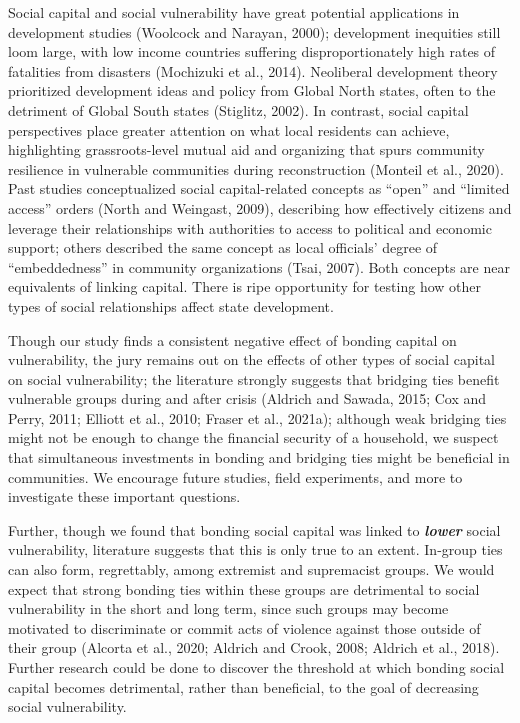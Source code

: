 \documentclass[]{elsarticle} %
\begin{document}
Social capital and social vulnerability have great potential
applications in development studies (Woolcock and Narayan, 2000);
development inequities still loom large, with low income countries
suffering disproportionately high rates of fatalities from disasters
(Mochizuki et al., 2014). Neoliberal development theory prioritized
development ideas and policy from Global North states, often to the
detriment of Global South states (Stiglitz, 2002). In contrast, social
capital perspectives place greater attention on what local residents can
achieve, highlighting grassroots-level mutual aid and organizing that
spurs community resilience in vulnerable communities during
reconstruction (Monteil et al., 2020). Past studies conceptualized
social capital-related concepts as ``open'' and ``limited access''
orders (North and Weingast, 2009), describing how effectively citizens
and leverage their relationships with authorities to access to political
and economic support; others described the same concept as local
officials' degree of ``embeddedness'' in community organizations (Tsai,
2007). Both concepts are near equivalents of linking capital. There is
ripe opportunity for testing how other types of social relationships
affect state development.

Though our study finds a consistent negative effect of bonding capital
on vulnerability, the jury remains out on the effects of other types of
social capital on social vulnerability; the literature strongly suggests
that bridging ties benefit vulnerable groups during and after crisis
(Aldrich and Sawada, 2015; Cox and Perry, 2011; Elliott et al., 2010;
Fraser et al., 2021a); although weak bridging ties might not be enough
to change the financial security of a household, we suspect that
simultaneous investments in bonding and bridging ties might be
beneficial in communities. We encourage future studies, field
experiments, and more to investigate these important questions.

Further, though we found that bonding social capital was linked to
\textbf{\emph{lower}} social vulnerability, literature suggests that
this is only true to an extent. In-group ties can also form,
regrettably, among extremist and supremacist groups. We would expect
that strong bonding ties within these groups are detrimental to social
vulnerability in the short and long term, since such groups may become
motivated to discriminate or commit acts of violence against those
outside of their group (Alcorta et al., 2020; Aldrich and Crook, 2008;
Aldrich et al., 2018). Further research could be done to discover the
threshold at which bonding social capital becomes detrimental, rather
than beneficial, to the goal of decreasing social vulnerability.
\end{document}
